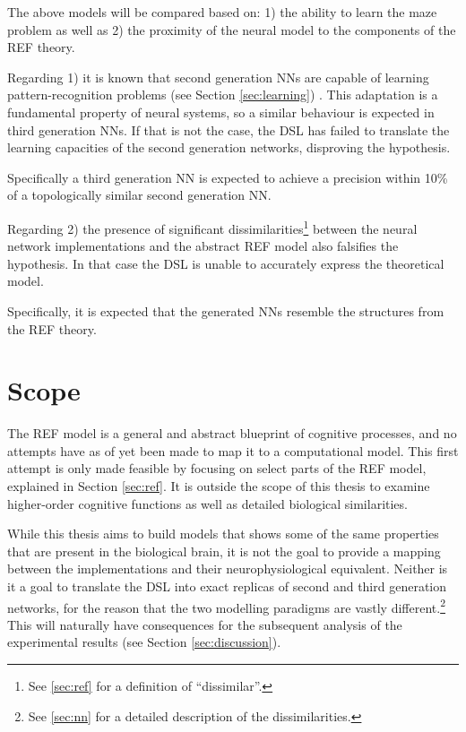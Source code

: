 The above models will be compared based on:
1) the ability to learn the maze problem as well as 
2) the proximity of the neural model to the components of the
   \gls{REF} theory.

Regarding 1) it is known that second generation \gls{NN}s are
capable of learning pattern-recognition problems (see Section \ref{sec:learning})
\cite{Russel2007}.
This adaptation is a fundamental property of neural systems, so a
similar behaviour is expected in third generation \gls{NN}s.
If that is not the case, the \gls{DSL} has failed to translate
the learning capacities of the second generation networks,
disproving the hypothesis.

Specifically a third generation \gls{NN} is expected to
achieve a precision within 10\% of a topologically similar
second generation \gls{NN}.

Regarding 2) the presence of significant
dissimilarities\footnote{See \ref{sec:ref} for a definition of
\enquote{dissimilar}.} between the neural network implementations 
and the abstract \gls{REF} model also falsifies the hypothesis. 
In that case the \gls{DSL} is unable to accurately express the
theoretical model.

Specifically, it is expected that the generated \gls{NN}s resemble
the structures from the \gls{REF} theory.

\section{Scope} \label{sec:scope}
The \gls{REF} model is a general and abstract blueprint of cognitive
processes, and no attempts have as of yet been made to map it to
a computational model.
This first attempt is only made feasible by focusing on select parts
of the \gls{REF} model, explained in Section \ref{sec:ref}.
It is outside the scope of this thesis to examine
higher-order cognitive functions as well as detailed biological
similarities.

While this thesis aims to build models that shows some of the same
properties that are present in the biological brain,  
it is not the goal to provide a mapping between the
implementations and their neurophysiological equivalent.
Neither is it a goal to translate the \gls{DSL} into exact replicas
of second and third generation networks, for the reason that the
two modelling paradigms are vastly different.\footnote{See \ref{sec:nn}
for a detailed description of the dissimilarities.}
This will naturally have consequences for the subsequent analysis of the
experimental results (see Section \ref{sec:discussion}).


